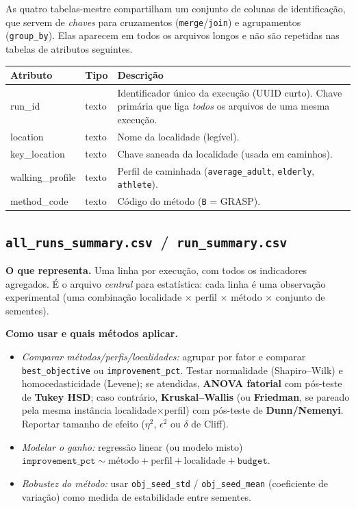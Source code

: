 \documentclass[11pt,a4paper]{article}
\begin{document}
As quatro tabelas-mestre compartilham um conjunto de colunas de identificação,
que servem de \emph{chaves} para cruzamentos (\texttt{merge}/\texttt{join}) e
agrupamentos (\texttt{group\_by}). Elas aparecem em todos os arquivos longos e não
são repetidas nas tabelas de atributos seguintes.

\begin{center}\small
\begin{tabular}{@{}>{\ttfamily}l l p{8.4cm}@{}}
\toprule
\normalfont Atributo & \normalfont Tipo & \normalfont Descrição \\
\midrule
run\_id          & texto    & Identificador único da execução (UUID curto). Chave primária que liga \emph{todos} os arquivos de uma mesma execução. \\
location         & texto    & Nome da localidade (legível). \\
key\_location    & texto    & Chave saneada da localidade (usada em caminhos). \\
walking\_profile & texto    & Perfil de caminhada (\texttt{average\_adult}, \texttt{elderly}, \texttt{athlete}). \\
method\_code     & texto    & Código do método (\texttt{B} = GRASP). \\
\bottomrule
\end{tabular}
\end{center}

\subsection{\texttt{all\_runs\_summary.csv} \,/\, \texttt{run\_summary.csv}}

\textbf{O que representa.} Uma linha por execução, com todos os indicadores
agregados. É o arquivo \emph{central} para estatística: cada linha é uma
observação experimental (uma combinação localidade $\times$ perfil $\times$ método
$\times$ conjunto de sementes).

\textbf{Como usar e quais métodos aplicar.}
\begin{itemize}\setlength\itemsep{1pt}
\item \emph{Comparar métodos/perfis/localidades:} agrupar por fator e comparar
\texttt{best\_objective} ou \texttt{improvement\_pct}. Testar normalidade
(Shapiro--Wilk) e homocedasticidade (Levene); se atendidas, \textbf{ANOVA
fatorial} com pós-teste de \textbf{Tukey HSD}; caso contrário, \textbf{Kruskal--Wallis}
(ou \textbf{Friedman}, se pareado pela mesma instância localidade$\times$perfil)
com pós-teste de \textbf{Dunn/Nemenyi}. Reportar tamanho de efeito
($\eta^2$, $\epsilon^2$ ou $\delta$ de Cliff).
\item \emph{Modelar o ganho:} regressão linear (ou modelo misto)
$\texttt{improvement\_pct} \sim \text{método}+\text{perfil}+\text{localidade}+\texttt{budget}$.
\item \emph{Robustez do método:} usar \texttt{obj\_seed\_std} / \texttt{obj\_seed\_mean}
(coeficiente de variação) como medida de estabilidade entre sementes.
\end{itemize}
\end{document}
